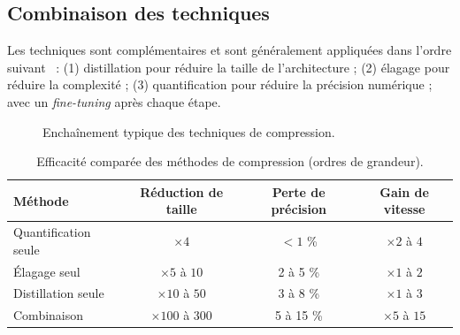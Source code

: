 \subsection{Combinaison des techniques}

Les techniques sont complémentaires et sont généralement appliquées dans
l'ordre suivant~\cite{han2016deep} : (1) distillation pour réduire la taille de
l'architecture ; (2) élagage pour réduire la complexité ; (3) quantification
pour réduire la précision numérique ; avec un \emph{fine-tuning} après chaque
étape.

\begin{figure}[H]
\centering
{}
\caption{Enchaînement typique des techniques de compression.}
\label{fig:compression}
\end{figure}

\begin{table}[H]
\centering
\small
\begin{tabular}{lccc}
\toprule
Méthode & Réduction de taille & Perte de précision & Gain de vitesse \\
\midrule
Quantification seule & $\times 4$         & $< 1$ \%     & $\times 2$ à $4$ \\
Élagage seul         & $\times 5$ à $10$  & 2 à 5 \%     & $\times 1$ à $2$ \\
Distillation seule   & $\times 10$ à $50$ & 3 à 8 \%     & $\times 1$ à $3$ \\
Combinaison          & $\times 100$ à $300$ & 5 à 15 \%  & $\times 5$ à $15$ \\
\bottomrule
\end{tabular}
\caption{Efficacité comparée des méthodes de compression (ordres de grandeur).}
\label{tab:compression}
\end{table}

